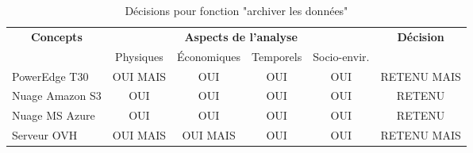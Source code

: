 

\begin{table}[!htbp]
	\begin{tabular}{|l|c|c|c|c|c|}
		\hline
		\multicolumn{1}{|c|}{\multirow{2}{*}{\textbf{Concepts}}} & \multicolumn{4}{c|}{\textbf{Aspects de l'analyse}} & \multirow{2}{*}{\textbf{Décision}} \\ \cline{2-5}
		\multicolumn{1}{|c|}{}                                   & Physiques & Économiques & Temporels & Socio-envir. &                                    \\ \hline
		PowerEdge T30                                                 & OUI MAIS       & OUI         & OUI       & OUI          & RETENU MAIS                             \\ \hline
		Nuage Amazon S3                                                 & OUI       & OUI         & OUI       & OUI          & RETENU                             \\ \hline
		Nuage MS Azure                                                 & OUI       & OUI         & OUI       & OUI          & RETENU                             \\ \hline
		Serveur OVH                                                & OUI MAIS      & OUI MAIS        & OUI       & OUI          & RETENU MAIS        \\ \hline
	\end{tabular}
	\caption{Décisions pour fonction "archiver les données"}
	\label{tab:fct_archiver}
\end{table}